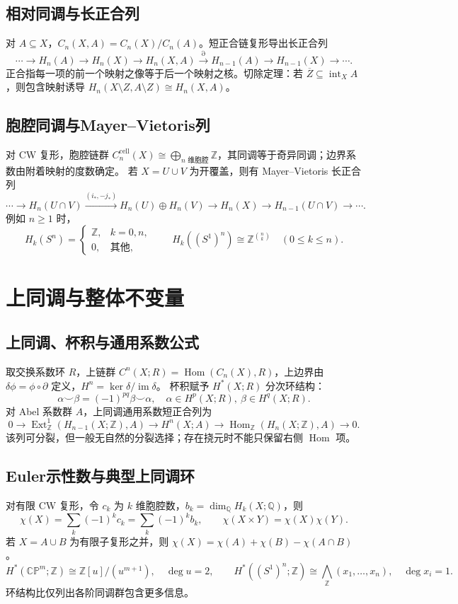\documentclass[../main.tex]{subfiles}
\begin{document}
\subsection{相对同调与长正合列}
对 $A\subseteq X$，$C_n(X,A)=C_n(X)/C_n(A)$。短正合链复形导出长正合列
\[
\cdots\to H_n(A)\to H_n(X)\to H_n(X,A)
\xrightarrow{\partial}H_{n-1}(A)\to H_{n-1}(X)\to\cdots.
\]
正合指每一项的前一个映射之像等于后一个映射之核。切除定理：若 $\overline Z\subseteq\operatorname{int}_X A$，则包含映射诱导 $H_n(X\setminus Z,A\setminus Z)\cong H_n(X,A)$。
\subsection{胞腔同调与Mayer--Vietoris列}
对 CW 复形，胞腔链群 $C_n^{\mathrm{cell}}(X)\cong\bigoplus_{n\text{ 维胞腔}}\mathbb Z$，其同调等于奇异同调；边界系数由附着映射的度数确定。
若 $X=U\cup V$ 为开覆盖，则有 Mayer--Vietoris 长正合列
\[
\cdots\to H_n(U\cap V)\xrightarrow{(i_*,-j_*)}H_n(U)\oplus H_n(V)
\to H_n(X)\to H_{n-1}(U\cap V)\to\cdots.
\]
例如 $n\ge1$ 时，
\[
H_k(S^n)=\begin{cases}\mathbb Z,&k=0,n,\\0,&\text{其他},\end{cases}
\qquad H_k((S^1)^n)\cong\mathbb Z^{\binom nk}\quad(0\le k\le n).
\]
\section{上同调与整体不变量}
\subsection{上同调、杯积与通用系数公式}
取交换系数环 $R$，上链群 $C^n(X;R)=\operatorname{Hom}(C_n(X),R)$，上边界由 $\delta\phi=\phi\circ\partial$ 定义，$H^n=\ker\delta/\operatorname{im}\delta$。
杯积赋予 $H^*(X;R)$ 分次环结构：
\[
\alpha\smile\beta=(-1)^{pq}\beta\smile\alpha,
\quad\alpha\in H^p(X;R),\ \beta\in H^q(X;R).
\]
对 Abel 系数群 $A$，上同调通用系数短正合列为
\[
0\to\operatorname{Ext}_{\mathbb Z}^1(H_{n-1}(X;\mathbb Z),A)
\to H^n(X;A)\to\operatorname{Hom}_{\mathbb Z}(H_n(X;\mathbb Z),A)\to0.
\]
该列可分裂，但一般无自然的分裂选择；存在挠元时不能只保留右侧 $\operatorname{Hom}$ 项。
\subsection{Euler示性数与典型上同调环}
对有限 CW 复形，令 $c_k$ 为 $k$ 维胞腔数，$b_k=\dim_{\mathbb Q}H_k(X;\mathbb Q)$，则
\[
\chi(X)=\sum_k(-1)^kc_k=\sum_k(-1)^kb_k,\qquad
\chi(X\times Y)=\chi(X)\chi(Y).
\]
若 $X=A\cup B$ 为有限子复形之并，则 $\chi(X)=\chi(A)+\chi(B)-\chi(A\cap B)$。
\[
H^*(\mathbb{CP}^{m};\mathbb Z)\cong\mathbb Z[u]/(u^{m+1}),\quad\deg u=2,
\qquad H^*((S^1)^n;\mathbb Z)\cong\bigwedge_{\mathbb Z}(x_1,\ldots,x_n),\quad\deg x_i=1.
\]
环结构比仅列出各阶同调群包含更多信息。
\end{document}
